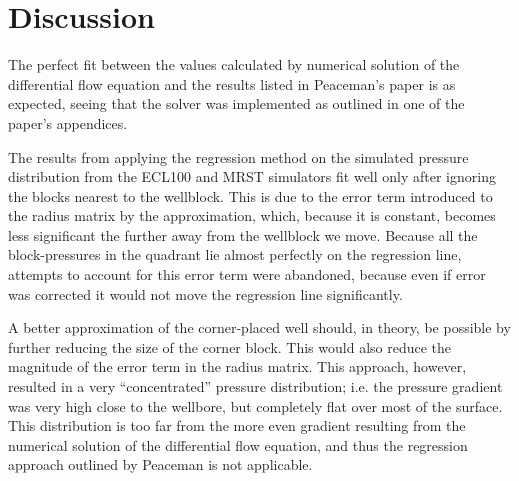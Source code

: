 \section{Discussion} %
\label{sec:discussion}
The perfect fit between the values calculated by numerical solution of the differential flow equation and the results listed in Peaceman's paper \cite{Peaceman1978Interpretation} is as expected, seeing that the solver was implemented as outlined in one of the paper's appendices.

The results from applying the regression method on the simulated pressure distribution from the ECL100 and MRST simulators fit well only after ignoring the blocks nearest to the wellblock. This is due to the error term introduced to the radius matrix by the approximation, which, because it is constant, becomes less significant the further away from the wellblock we move. Because all the block-pressures in the quadrant lie almost perfectly on the regression line, attempts to account for this error term were abandoned, because even if error was corrected it would not move the regression line significantly.

A better approximation of the corner-placed well should, in theory, be possible by further reducing the size of the corner block. This would also reduce the magnitude of the error term in the radius matrix. This approach, however, resulted in a very ``concentrated'' pressure distribution; i.e. the pressure gradient was very high  close to the wellbore, but completely flat over most of the surface. This distribution is too far from the more even gradient resulting from the numerical solution of the differential flow equation, and thus the regression approach outlined by Peaceman is not applicable.
